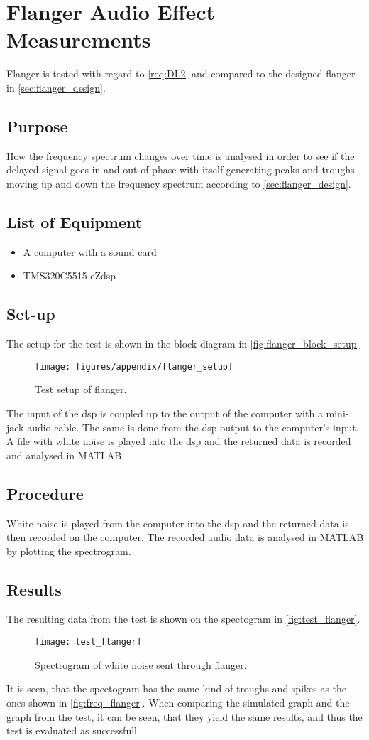 \chapter{Flanger Audio Effect Measurements}\label{flanger_meas_app} 
Flanger is tested with regard to \autoref{req:DL2} and compared to the designed flanger in \autoref{sec:flanger_design}.
\section{Purpose}
How the frequency spectrum changes over time is analysed in order to see if the delayed signal goes in and out of phase with itself generating peaks and troughs moving up and down the frequency spectrum according to \autoref{sec:flanger_design}.
\section{List of Equipment}

\begin{itemize}
	\item A computer with a sound card
	\item TMS320C5515 eZdsp
\end{itemize}

\section{Set-up}
The setup for the test is shown in the block diagram in \autoref{fig:flanger_block_setup}
\begin{figure}[H]
	\centering
	\texttt{[image: figures/appendix/flanger\_setup]}
	\caption{Test setup of flanger.}
	\label{fig:flanger_block_setup}
\end{figure}
The input of the \gls{dsp} is coupled up to the output of the computer with a mini-jack audio cable. The same is done from the \gls{dsp} output to the computer's input. A file with white noise is played into the \gls{dsp} and the returned data is recorded and analysed in MATLAB. 
\section{Procedure}

White noise is played from the computer into the \gls{dsp} and the returned data is then recorded on the computer. The recorded audio data is analysed in MATLAB by plotting the spectrogram.

\section{Results}
The resulting data from the test is shown on the spectogram in \autoref{fig:test_flanger}. 
\begin{figure}[hbpt]
	\centering
	\texttt{[image: test\_flanger]}
	\caption{Spectrogram of white noise sent through flanger.}
	\label{fig:test_flanger}
\end{figure}

It is seen, that the spectogram has the same kind of troughs and spikes as the ones shown in \autoref{fig:freq_flanger}. When comparing the simulated graph and the graph from the test, it can be seen, that they yield the same results, and thus the test is evaluated as successfull 
